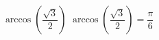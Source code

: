  {$\arccos \left( \dfrac{\sqrt{3}}{2} \right)$}
{ $\arccos \left( \dfrac{\sqrt{3}}{2} \right) = \dfrac{\pi}{6}$}
